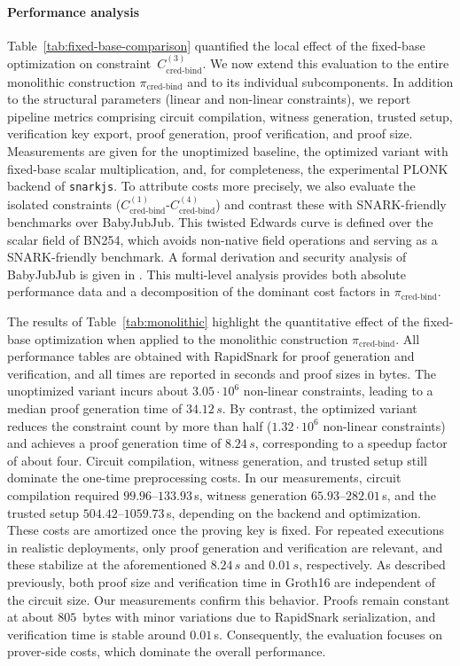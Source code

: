 \paragraph{Performance analysis}
Table~\ref{tab:fixed-base-comparison} quantified the local effect of the fixed-base optimization on constraint~$C_{\text{cred-bind}}^{(3)}$. We now extend this evaluation to the entire monolithic construction $\pi_{\text{cred-bind}}$ and to its individual subcomponents. In addition to the structural parameters (linear and non-linear constraints), we report pipeline metrics comprising circuit compilation, witness generation, trusted setup, verification key export, proof generation, proof verification, and proof size. Measurements are given for the unoptimized baseline, the optimized variant with fixed-base scalar multiplication, and, for completeness, the experimental PLONK backend of \texttt{snarkjs}. To attribute costs more precisely, we also evaluate the isolated constraints ($C_{\text{cred-bind}}^{(1)}$-$C_{\text{cred-bind}}^{(4)}$) and contrast these with SNARK-friendly benchmarks over BabyJubJub. This twisted Edwards curve is defined over the scalar field of BN254, which avoids non-native field operations and serving as a SNARK-friendly benchmark. A formal derivation and security analysis of BabyJubJub is given in \cite{BellesMunoz2021}. This multi-level analysis provides both absolute performance data and a decomposition of the dominant cost factors in $\pi_{\text{cred-bind}}$.

The results of Table~\ref{tab:monolithic} highlight the quantitative effect of the fixed-base optimization when applied to the monolithic construction $\pi_{\text{cred-bind}}$. All performance tables are obtained with RapidSnark for proof generation and verification, and all times are reported in seconds and proof sizes in bytes. The unoptimized variant incurs about $3.05 \cdot 10^6$ non-linear constraints, leading to a median proof generation time of $34.12\,s$. By contrast, the optimized variant reduces the constraint count by more than half ($1.32 \cdot 10^6$ non-linear constraints) and achieves a proof generation time of $8.24\,s$, corresponding to a speedup factor of about four. Circuit compilation, witness generation, and trusted setup still dominate the one-time preprocessing costs. In our measurements, circuit compilation required $99.96$--$133.93$\,s, witness generation $65.93$--$282.01$\,s, and the trusted setup $504.42$--$1059.73$\,s, depending on the backend and optimization. These costs are amortized once the proving key is fixed. For repeated executions in realistic deployments, only proof generation and verification are relevant, and these stabilize at the aforementioned $8.24\,s$ and $0.01\,s$, respectively. 
As described previously, both proof size and verification time in Groth16 are independent of the circuit size. Our measurements confirm this behavior. Proofs remain constant at about $805$~bytes with minor variations due to RapidSnark serialization, and verification time is stable around $0.01$\,s. Consequently, the evaluation focuses on prover-side costs, which dominate the overall performance.

